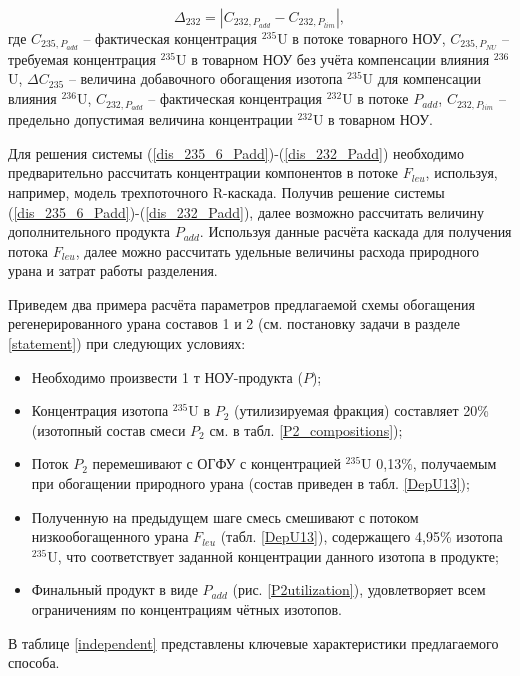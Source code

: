 \begin{equation}\label{dis_232_Padd}
    \Delta_{232}=\left|C_{232,P_{add}}-C_{232,P_{lim}}\right|,
\end{equation}
где $C_{235,P_{add}}$ -- фактическая концентрация $^{235}$U в потоке товарного НОУ, $C_{235,P_{NU}}$ -- требуемая концентрация $^{235}$U в товарном НОУ без учёта компенсации влияния $^{236}$U, $\Delta C_{235}$ -- величина добавочного обогащения изотопа $^{235}$U для компенсации влияния $^{236}$U, $C_{232,P_{add}}$ -- фактическая концентрация $^{232}$U в потоке $P_{add}$, $C_{232,P_{lim}}$ -- предельно допустимая величина концентрации $^{232}$U в товарном НОУ.

Для решения системы (\ref{dis_235_6_Padd})-(\ref{dis_232_Padd}) необходимо предварительно рассчитать концентрации компонентов в потоке $F_{leu}$, используя, например, модель трехпоточного R-каскада. Получив решение системы (\ref{dis_235_6_Padd})-(\ref{dis_232_Padd}), далее возможно рассчитать величину дополнительного продукта $P_{add}$. Используя данные расчёта каскада для получения потока $F_{leu}$, далее можно рассчитать удельные величины расхода природного урана и затрат работы разделения.  

Приведем два примера расчёта параметров предлагаемой схемы обогащения регенерированного урана составов 1 и 2 (см. постановку задачи в разделе \ref{statement}) при следующих условиях:
\begin{itemize}
    \item Необходимо произвести 1 т НОУ-продукта ($P$);
    \item Концентрация изотопа $^{235}$U в $P_2$ (утилизируемая фракция) составляет 20\% (изотопный состав смеси $P_2$ см. в табл. \ref{P2_compositions});
    \item Поток $P_2$ перемешивают с ОГФУ с концентрацией $^{235}$U 0,13\%, получаемым при обогащении природного урана (состав приведен в табл. \ref{DepU13});
    \item Полученную на предыдущем шаге смесь смешивают с потоком низкообогащенного урана $F_{leu}$ (табл. \ref{DepU13}), содержащего 4,95\% изотопа $^{235}$U, что соответствует заданной концентрации данного изотопа в продукте;
    \item Финальный продукт в виде $P_{add}$ (рис. \ref{P2utilization}), удовлетворяет всем ограничениям по концентрациям чётных изотопов.
\end{itemize}

В таблице \ref{independent} представлены ключевые характеристики предлагаемого способа.

